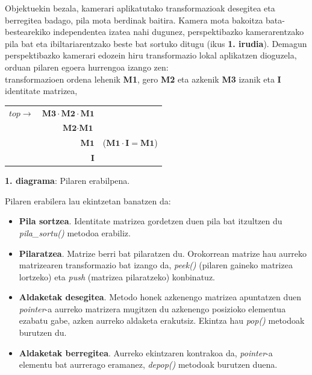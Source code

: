 \documentclass[12pt]{article}
\newcommand{\metodo}[1] {\textit{#1}}
\begin{document}
Objektuekin bezala, kamerari aplikatutako transformazioak desegitea eta berregitea badago, pila mota berdinak baitira. Kamera mota bakoitza bata-bestearekiko independentea izatea nahi dugunez, perspektibazko kamerarentzako pila bat eta ibiltariarentzako beste bat sortuko ditugu (ikus \textbf{1. irudia}). Demagun perspektibazko kamerari edozein hiru transformazio lokal aplikatzen dioguzela, orduan pilaren egoera hurrengoa izango zen:\\
transformazioen ordena lehenik \textbf{M1}, gero \textbf{M2} eta azkenik \textbf{M3} izanik eta \textbf{I} identitate matrizea,

\begin{center}
\begin{tabular}{r|r|r}
 \cline{2-2}
 $top \rightarrow$ & $\textbf{M3} \cdot \textbf{M2} \cdot \textbf{M1}$ & \\
 \cline{2-2}
 & $\textbf{M2} \cdot \textbf{M1}$ & \\
 \cline{2-2}
 & $\textbf{M1}$ & \hspace{0.5cm} ($\textbf{M1} \cdot \textbf{I} = \textbf{M1}$) \\
 \cline{2-2}
 & $\textbf{I}$ & \\
 \cline{2-2}
\end{tabular}

\textbf{1. diagrama}: Pilaren erabilpena.
\end{center}

Pilaren erabilera lau ekintzetan banatzen da:

\begin{itemize}
\item \textbf{Pila sortzea}. Identitate matrizea gordetzen duen pila bat itzultzen du \metodo{pila\_sortu()} metodoa erabiliz.

\item \textbf{Pilaratzea}. Matrize berri bat pilaratzen du. Orokorrean matrize hau aurreko matrizearen transformazio bat izango da, \metodo{peek()} (pilaren gaineko matrizea lortzeko) eta \metodo{push} (matrizea pilaratzeko) konbinatuz.

\item \textbf{Aldaketak desegitea}. Metodo honek azkenengo matrizea apuntatzen duen \textit{pointer}-a\cite{pointer} aurreko matrizera mugitzen du azkenengo posizioko elementua ezabatu gabe, azken aurreko aldaketa erakutsiz. Ekintza hau \metodo{pop()} metodoak burutzen du.

\item \textbf{Aldaketak berregitea}. Aurreko ekintzaren kontrakoa da, \textit{pointer}-a elementu bat aurrerago eramanez, \metodo{depop()} metodoak burutzen duena. 
\end{itemize}
\end{document}
